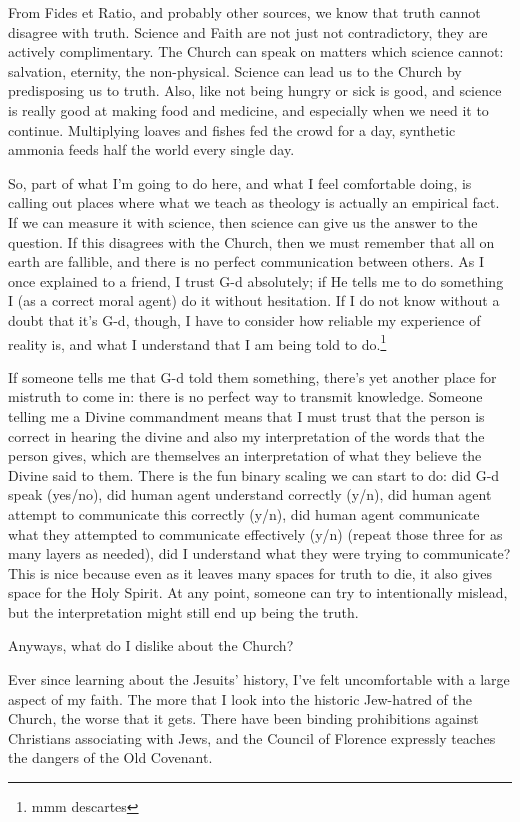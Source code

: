 \documentclass[12pt]{article}
\renewcommand{\,}{\textsuperscript{,}}
\begin{document}
From Fides et Ratio, and probably other sources, we know that truth cannot disagree with truth.  
Science and Faith are not just not contradictory, they are actively complimentary.  
The Church can speak on matters which science cannot: salvation, eternity, the non-physical.  
Science can lead us to the Church by predisposing us to truth.  
Also, like not being hungry or sick is good, and science is really good at making food and medicine, and especially when we need it to continue.  
Multiplying loaves and fishes fed the crowd for a day, synthetic ammonia feeds half the world every single day.

So, part of what I'm going to do here, and what I feel comfortable doing, is calling out places where what we teach as theology is actually an empirical fact.  
If we can measure it with science, then science can give us the answer to the question.  
If this disagrees with the Church, then we must remember that all on earth are fallible, and there is no perfect communication between others.  
As I once explained to a friend, I trust G-d absolutely; if He tells me to do something I (as a correct moral agent) do it without hesitation.  
If I do not know without a doubt that it's G-d, though, I have to consider how reliable my experience of reality is, and what I understand that I am being told to do.\footnote{mmm descartes}

If someone tells me that G-d told them something, there's yet another place for mistruth to come in: there is no perfect way to transmit knowledge.  
Someone telling me a Divine commandment means that I must trust that the person is correct in hearing the divine and also my interpretation of the words that the person gives, which are themselves an interpretation of what they believe the Divine said to them.  
There is the fun binary scaling we can start to do: did G-d speak (yes/no), did human agent understand correctly (y/n), did human agent attempt to communicate this correctly (y/n), did human agent communicate what they attempted to communicate effectively (y/n) (repeat those three for as many layers as needed), did I understand what they were trying to communicate?  
This is nice because even as it leaves many spaces for truth to die, it also gives space for the Holy Spirit.  
At any point, someone can try to intentionally mislead, but the interpretation might still end up being the truth.

Anyways, what do I dislike about the Church?

Ever since learning about the Jesuits' history, I've felt uncomfortable with a large aspect of my faith.  
The more that I look into the historic Jew-hatred of the Church, the worse that it gets.  
There have been binding prohibitions against Christians associating with Jews, and the Council of Florence expressly teaches the dangers of the Old Covenant.
\end{document}
